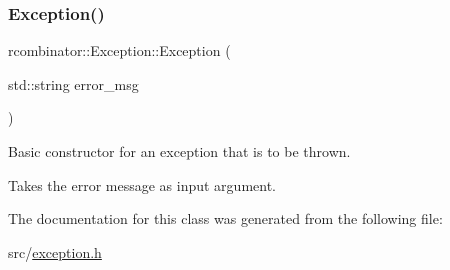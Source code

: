\subsubsection{\texorpdfstring{Exception()}{Exception()}}
{\footnotesize\ttfamily rcombinator\+::\+Exception\+::\+Exception (\begin{DoxyParamCaption}\item[{std\+::string}]{error\+\_\+msg }\end{DoxyParamCaption})\hspace{0.3cm}{\ttfamily [inline]}}



Basic constructor for an exception that is to be thrown. 

Takes the error message as input argument. 

The documentation for this class was generated from the following file\+:\begin{DoxyCompactItemize}
\item 
src/\mbox{\hyperlink{exception_8h}{exception.\+h}}\end{DoxyCompactItemize}
